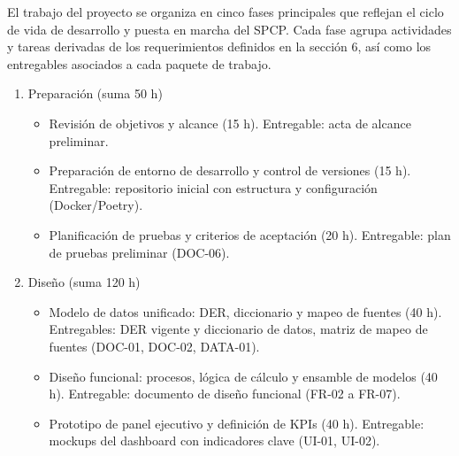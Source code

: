 \documentclass[12pt]
{charter}
\begin{document}
El trabajo del proyecto se organiza en cinco fases principales que reflejan el ciclo de vida de desarrollo y puesta en marcha del SPCP. 
Cada fase agrupa actividades y tareas derivadas de los requerimientos definidos en la sección 6, así como los entregables asociados a cada paquete de trabajo.

\begin{enumerate}
  \item Preparación (suma 50 h)
    \begin{itemize}
      \item Revisión de objetivos y alcance (15 h). Entregable: acta de alcance preliminar.
      \item Preparación de entorno de desarrollo y control de versiones (15 h). Entregable: repositorio inicial con estructura y configuración (Docker/Poetry).
      \item Planificación de pruebas y criterios de aceptación (20 h). Entregable: plan de pruebas preliminar (DOC-06).
    \end{itemize}

  \item Diseño (suma 120 h)
    \begin{itemize}
      \item Modelo de datos unificado: DER, diccionario y mapeo de fuentes (40 h). Entregables: DER vigente y diccionario de datos, matriz de mapeo de fuentes (DOC-01, DOC-02, DATA-01).
      \item Diseño funcional: procesos, lógica de cálculo y ensamble de modelos (40 h). Entregable: documento de diseño funcional (FR-02 a FR-07).
      \item Prototipo de panel ejecutivo y definición de KPIs (40 h). Entregable: mockups del dashboard con indicadores clave (UI-01, UI-02).
    \end{itemize}


\end{enumerate}
\end{document}
